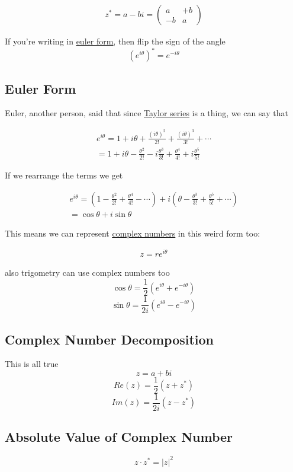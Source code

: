 \documentclass[
]{article}
\let\oldhyperref\hyperref
\renewcommand{\hyperref}[2][]{\oldhyperref[#1]{\underline{#2}}}
\begin{document}
\begin{gather*}
	z^*=a-bi=\begin{pmatrix}a  & +b \\
	               -b & a
	\end{pmatrix}
\end{gather*}

If you're writing in \hyperref[euler-form]{euler form}, then flip the sign of the angle
\[
	(e^{i\theta})^*=e^{-i\theta}
\]



\subsection{Euler Form}\label{euler-form}
Euler, another person, said that since \hyperref[taylor-series]{Taylor series} is a thing, we can say that

\begin{gather*}
	e^{i\theta}=1+i\theta+\frac{(i\theta)^2}{2!}+\frac{(i\theta)^3}{3!}+\cdots\\
	=1+i\theta-\frac{\theta^2}{2!}-i\frac{\theta^3}{3!}+\frac{\theta^4}{4!}+i\frac{\theta^5}{5!}
\end{gather*}

If we rearrange the terms we get

\begin{gather*}
	e^{i\theta}=\left(1-\frac{\theta^2}{2!}+\frac{\theta^4}{4!}-\cdots\right)+i\left(\theta -\frac{\theta^3}{3!}+\frac{\theta^5}{5!}+\cdots\right)\\
	=\cos\theta+i\sin\theta
\end{gather*}

This means we can represent \hyperref[complex-numbers]{complex numbers} in this weird form too:

\begin{gather*}
	z=re^{i\theta}
\end{gather*}

also trigometry can use complex numbers too
\[
	\cos\theta=
	\frac{1}{2}(e^{i\theta}+e^{-i\theta})
\]
\[
	\sin\theta=
	\frac{1}{2i}(e^{i\theta}-e^{-i\theta})
\]

\subsection{Complex Number Decomposition}\label{complex-number-decomposition}
This is all true
\[
	z = a+bi
\]
\[
	Re(z)=\frac{1}{2}(z+z^*)
\]
\[
	Im(z)=\frac{1}{2i}(z-z^*)
\]
\subsection{Absolute Value of Complex Number}\label{absolute-value-of-complex-number}
\[
	z\cdot z^*=|z|^2
\]
\end{document}
